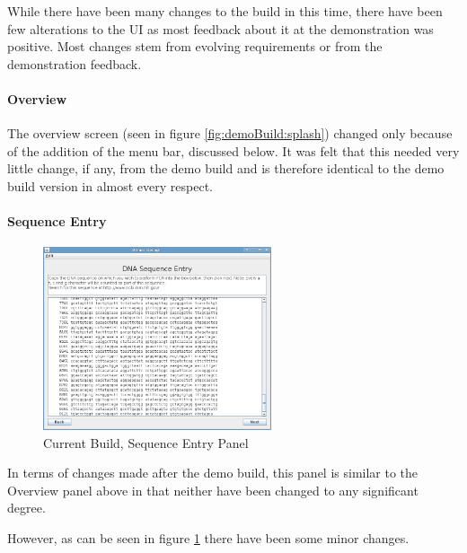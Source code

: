While there have been many changes to the build in this time, there
have been few alterations to the UI as most feedback about it at the
demonstration was positive.
Most changes stem from evolving requirements or from the
demonstration feedback.

\paragraph{Overview}
The overview screen (seen in figure \ref{fig:demoBuild:splash})
changed only because of the addition of the menu bar, discussed
below.
It was felt that this needed very little change, if any, from the demo
build and is therefore identical to the demo build version in almost
every respect.

\paragraph{Sequence Entry}

\begin{figure}[h]
  \begin{center}
    \includegraphics[width=0.6\textwidth]{./images/currentBuild/sequenceEntry.png}
    \caption{
      \label{fig:currentBuild:sequenceEntry}
      Current Build, Sequence Entry Panel
    }
  \end{center}
\end{figure}

In terms of changes made after the demo build, this panel is similar
to the Overview panel above in that neither have been changed to any
significant degree.

However, as can be seen in figure \ref{fig:currentBuild:sequenceEntry}
there have been some minor changes.

